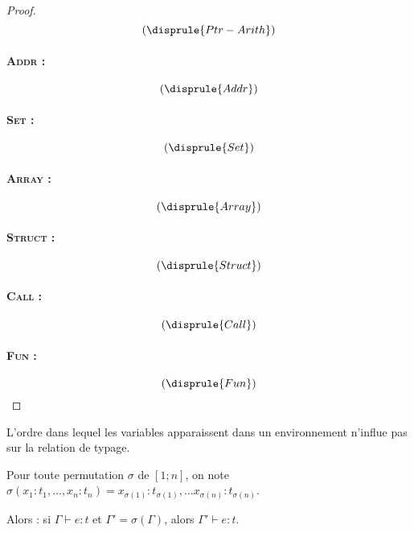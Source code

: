 \begin{proof}
\[ \left( \disprule{Ptr-Arith} \right) \]

\paragraph{\textsc{Addr} :} %

\[ \left( \disprule{Addr} \right) \]

\paragraph{\textsc{Set} :} %

\[ \left( \disprule{Set} \right) \]

\paragraph{\textsc{Array} :} %

\[ \left( \disprule{Array} \right) \]

\paragraph{\textsc{Struct} :} %

\[ \left( \disprule{Struct} \right) \]

\paragraph{\textsc{Call} :} %

\[ \left( \disprule{Call} \right) \]

\paragraph{\textsc{Fun} :} %

\[ \left( \disprule{Fun} \right) \]

\end{proof}

\begin{lemma}[Permutation]
  L'ordre dans lequel les variables apparaissent dans un environnement
  n'influe pas sur la relation de typage.

  Pour toute permutation $σ$ de $[1;n]$, on note $σ(x_1 : t_1, …, x_n : t_n) =
  x_{σ(1)} : t_{σ(1)}, … x_{σ(n)} : t_{σ(n)}$.

  Alors : si $Γ ⊢ e : t$ et $Γ' = σ(Γ)$, alors $Γ' ⊢ e : t$.
\end{lemma}

